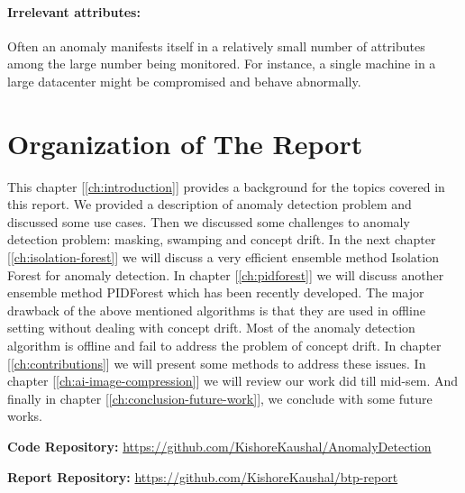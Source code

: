 \paragraph{Irrelevant attributes:}
Often an anomaly manifests itself in a relatively small number of attributes among the large number being monitored. 
For instance, a single machine in a large datacenter might be compromised and behave abnormally.

\section{Organization of The Report}
\label{sec:organization-of-the-report}

This chapter [\ref{ch:introduction}] provides a background for the topics covered in this report.
We provided a description of anomaly detection problem and discussed some use cases.
Then we discussed some challenges to anomaly detection problem: masking, swamping and concept drift.
In the next chapter [\ref{ch:isolation-forest}] we will discuss a very efficient ensemble method Isolation Forest for anomaly detection.
In chapter [\ref{ch:pidforest}] we will discuss another ensemble method PIDForest which has been recently developed.
The major drawback of the above mentioned algorithms is that they are used in offline setting without dealing with concept drift.
Most of the anomaly detection algorithm is offline and fail to address the problem of concept drift.
In chapter [\ref{ch:contributions}] we will present some methods to address these issues.
In chapter [\ref{ch:ai-image-compression}] we will review our work did till mid-sem.
And finally in chapter [\ref{ch:conclusion-future-work}], we conclude with some future works.

\vspace{2em}

\textbf{Code Repository: } \url{https://github.com/KishoreKaushal/AnomalyDetection}

\textbf{Report Repository: } \url{https://github.com/KishoreKaushal/btp-report}
